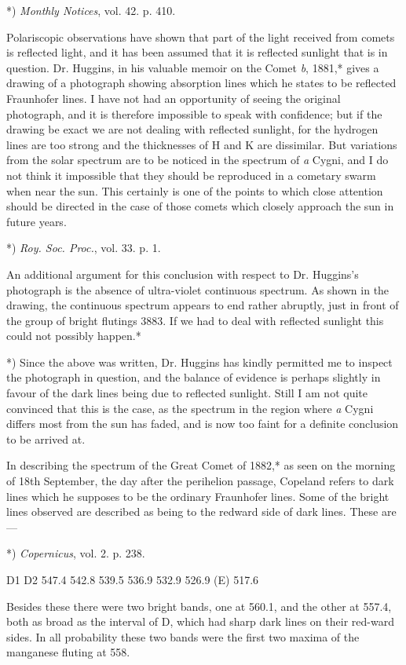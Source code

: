 \documentclass[a4paper, 12pt, oneside, polutonikogreek, english]{article}
\begin{document}
*) \emph{Monthly Notices}, vol. 42. p. 410.

Polariscopic observations have shown that part of the light received from comets is reflected light, and it has been assumed that it is reflected sunlight that is in question. Dr. Huggins, in his valuable memoir on the Comet \emph{b}, 1881,* gives a drawing of a photograph showing absorption lines which he states to be reflected Fraunhofer lines. I have not had an opportunity of seeing the original photograph, and it is therefore impossible to speak with confidence; but if the drawing be exact we are not dealing with reflected sunlight, for the hydrogen lines are too strong and the thicknesses of H and K are dissimilar. But variations from the solar spectrum are to be noticed in the spectrum of \emph{a} Cygni, and I do not think it impossible that they should be reproduced in a cometary swarm when near the sun. This certainly is one of the points to which close attention should be directed in the case of those comets which closely approach the sun in future years.

*) \emph{Roy. Soc. Proc.}, vol. 33. p. 1.

An additional argument for this conclusion with respect to Dr. Huggins's photograph is the absence of ultra-violet continuous spectrum. As shown in the drawing, the continuous spectrum appears to end rather abruptly, just in front of the group of bright flutings 3883. If we had to deal with reflected sunlight this could not possibly happen.*

*) Since the above was written, Dr. Huggins has kindly permitted me to inspect the photograph in question, and the balance of evidence is perhaps slightly in favour of the dark lines being due to reflected sunlight. Still I am not quite convinced that this is the case, as the spectrum in the region where \emph{a} Cygni differs most from the sun has faded, and is now too faint for a definite conclusion to be arrived at.

In describing the spectrum of the Great Comet of 1882,* as seen on the morning of 18th September, the day after the perihelion passage, Copeland refers to dark lines which he supposes to be the ordinary Fraunhofer lines. Some of the bright lines observed are described as being to the redward side of dark lines. These are ---

*) \emph{Copernicus}, vol. 2. p. 238.

D1 
D2 
547.4 
542.8 
539.5 
536.9 
532.9 
526.9 (E) 
517.6

Besides these there were two bright bands, one at 560.1, and the other at 557.4, both as broad as the interval of D, which had sharp dark lines on their red-ward sides. In all probability these two bands were the first two maxima of the manganese fluting at 558.
\end{document}
